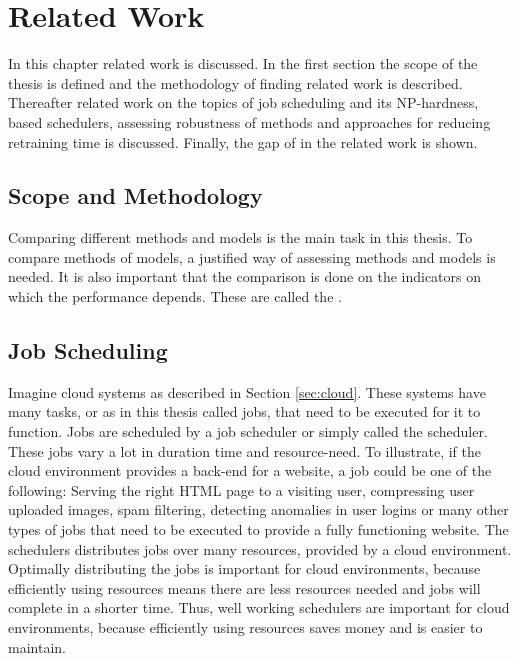 \chapter{Related Work}

In this chapter related work is discussed. In the first section the scope of
the thesis is defined and the methodology of finding related work is
described. Thereafter related work on the topics of job scheduling and its
NP-hardness, \rl based schedulers, assessing robustness of \rl methods and
approaches for reducing retraining time is discussed. Finally, the gap of in
the related work is shown.


\section{Scope and Methodology}

Comparing different methods and models is the main task in this thesis. To
compare methods of models, a justified way of assessing methods and models is
needed. It is also important that the comparison is done on the indicators on
which the performance depends. These are called the \kpis.



\section{Job Scheduling}\label{sec:scheduling}

Imagine cloud systems as described in Section \ref{sec:cloud}. These systems
have many tasks, or as in this thesis called jobs, that need to be executed
for it to function. Jobs are scheduled by a job scheduler or simply called the
scheduler. These jobs vary a lot in duration time and resource-need. To
illustrate, if the cloud environment provides a back-end for a website, a job
could be one of the following: Serving the right HTML page to a visiting user,
compressing user uploaded images, spam filtering, detecting anomalies in user
logins or many other types of jobs that need to be executed to provide a fully
functioning website. The schedulers distributes jobs over many resources,
provided by a cloud environment. Optimally distributing the jobs is important
for cloud environments, because efficiently using resources means there are
less resources needed and jobs will complete in a shorter time. Thus, well
working schedulers are important for cloud environments, because efficiently
using resources saves money and is easier to maintain.

